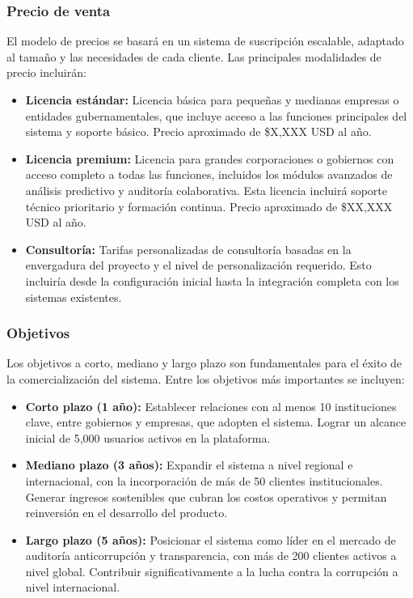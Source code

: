 \documentclass[a4paper,12pt]{article}
\begin{document}
\subsubsection{Precio de venta}
El modelo de precios se basará en un sistema de suscripción escalable, adaptado al tamaño y las necesidades de cada cliente. Las principales modalidades de precio incluirán:

\begin{itemize}
    \item \textbf{Licencia estándar:} Licencia básica para pequeñas y medianas empresas o entidades gubernamentales, que incluye acceso a las funciones principales del sistema y soporte básico. Precio aproximado de \$X,XXX USD al año.
    \item \textbf{Licencia premium:} Licencia para grandes corporaciones o gobiernos con acceso completo a todas las funciones, incluidos los módulos avanzados de análisis predictivo y auditoría colaborativa. Esta licencia incluirá soporte técnico prioritario y formación continua. Precio aproximado de \$XX,XXX USD al año.
    \item \textbf{Consultoría:} Tarifas personalizadas de consultoría basadas en la envergadura del proyecto y el nivel de personalización requerido. Esto incluiría desde la configuración inicial hasta la integración completa con los sistemas existentes.
\end{itemize}

\subsubsection{Objetivos}
Los objetivos a corto, mediano y largo plazo son fundamentales para el éxito de la comercialización del sistema. Entre los objetivos más importantes se incluyen:

\begin{itemize}
    \item \textbf{Corto plazo (1 año):} Establecer relaciones con al menos 10 instituciones clave, entre gobiernos y empresas, que adopten el sistema. Lograr un alcance inicial de 5,000 usuarios activos en la plataforma.
    \item \textbf{Mediano plazo (3 años):} Expandir el sistema a nivel regional e internacional, con la incorporación de más de 50 clientes institucionales. Generar ingresos sostenibles que cubran los costos operativos y permitan reinversión en el desarrollo del producto.
    \item \textbf{Largo plazo (5 años):} Posicionar el sistema como líder en el mercado de auditoría anticorrupción y transparencia, con más de 200 clientes activos a nivel global. Contribuir significativamente a la lucha contra la corrupción a nivel internacional.
\end{itemize}
\end{document}
